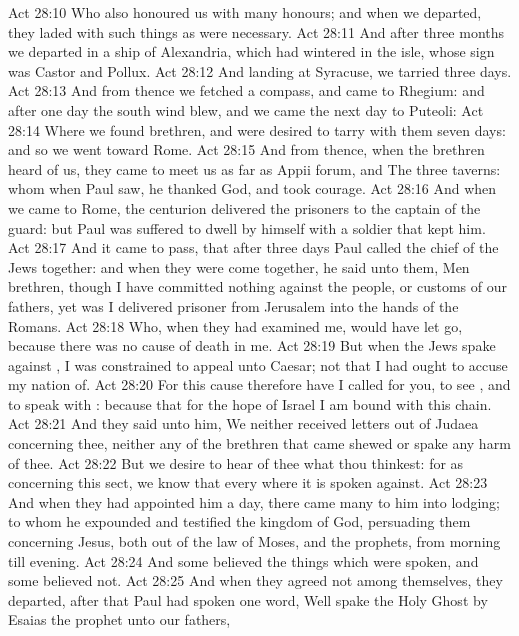 \vs Act 28:10 Who also honoured us with many honours; and when we departed, they laded  with such things as were necessary.
\vs Act 28:11 And after three months we departed in a ship of Alexandria, which had wintered in the isle, whose sign was Castor and Pollux.
\vs Act 28:12 And landing at Syracuse, we tarried  three days.
\vs Act 28:13 And from thence we fetched a compass, and came to Rhegium: and after one day the south wind blew, and we came the next day to Puteoli:
\vs Act 28:14 Where we found brethren, and were desired to tarry with them seven days: and so we went toward Rome.
\vs Act 28:15 And from thence, when the brethren heard of us, they came to meet us as far as Appii forum, and The three taverns: whom when Paul saw, he thanked God, and took courage.
\vs Act 28:16 And when we came to Rome, the centurion delivered the prisoners to the captain of the guard: but Paul was suffered to dwell by himself with a soldier that kept him.
\vs Act 28:17 And it came to pass, that after three days Paul called the chief of the Jews together: and when they were come together, he said unto them, Men  brethren, though I have committed nothing against the people, or customs of our fathers, yet was I delivered prisoner from Jerusalem into the hands of the Romans.
\vs Act 28:18 Who, when they had examined me, would have let  go, because there was no cause of death in me.
\vs Act 28:19 But when the Jews spake against , I was constrained to appeal unto Caesar; not that I had ought to accuse my nation of.
\vs Act 28:20 For this cause therefore have I called for you, to see , and to speak with : because that for the hope of Israel I am bound with this chain.
\vs Act 28:21 And they said unto him, We neither received letters out of Judaea concerning thee, neither any of the brethren that came shewed or spake any harm of thee.
\vs Act 28:22 But we desire to hear of thee what thou thinkest: for as concerning this sect, we know that every where it is spoken against.
\vs Act 28:23 And when they had appointed him a day, there came many to him into  lodging; to whom he expounded and testified the kingdom of God, persuading them concerning Jesus, both out of the law of Moses, and  the prophets, from morning till evening.
\vs Act 28:24 And some believed the things which were spoken, and some believed not.
\vs Act 28:25 And when they agreed not among themselves, they departed, after that Paul had spoken one word, Well spake the Holy Ghost by Esaias the prophet unto our fathers,
